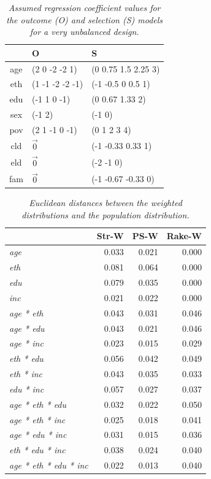 \documentclass[11pt]{article}
\begin{document}
\begin{table}
\begin{center}
\footnotesize
\begin{tabular}{c|p{7cm}|p{7cm}}
&O&S\\
\hline
age&(2 0 -2 -2 1)&(0 0.75 1.5 2.25 3)\\
eth&(1 -1 -2 -2 -1)&(-1 -0.5 0 0.5 1)\\
edu&(-1 1 0 -1)&(0 0.67 1.33 2)\\
sex&(-1 2)&(-1 0)\\
pov&(2 1 -1 0 -1)&(0 1 2 3 4)\\
cld&$\vec{0}$&(-1 -0.33 0.33 1)\\
eld&$\vec{0}$&(-2 -1 0)\\
fam&$\vec{0}$&(-1 -0.67 -0.33 0)
\end{tabular}
\end{center}
\caption{\em Assumed regression coefficient values for the outcome (O) and selection (S) models for a very unbalanced design.}
\label{s2-design-case2}
\end{table}



\begin{table}[ht]
\centering
\begin{tabular}{lrrr}
 & Str-W & PS-W & Rake-W \\ 
 \hline
 {\em age} & 0.033 & 0.021 & 0.000\\
 {\em eth}& 0.081 & 0.064 & 0.000 \\ 
{\em edu}  & 0.079 & 0.035 & 0.000 \\ 
{\em inc}& 0.021 & 0.022 & 0.000 \\ 

{\em age * eth}& 0.043 & 0.031 & 0.046 \\
{\em age * edu}& 0.043 & 0.021 & 0.046 \\
{\em age * inc}& 0.023 & 0.015 & 0.029 \\

{\em eth * edu} & 0.056 & 0.042 & 0.049 \\ 
{\em eth * inc}& 0.043 & 0.035 & 0.033 \\ 
{\em edu * inc} & 0.057 & 0.027 & 0.037 \\

{\em age * eth * edu}& 0.032 & 0.022 & 0.050 \\ 
{\em age * eth * inc}& 0.025 & 0.018 & 0.041 \\


{\em age * edu * inc } & 0.031 & 0.015 & 0.036 \\
{\em eth * edu * inc}&0.038 & 0.024 & 0.040 \\
{\em age * eth * edu * inc}& 0.022 & 0.013 & 0.040
\end{tabular}
\caption{\em Euclidean distances between the weighted distributions and the population distribution.}
\label{prob-dist}
\end{table}
\end{document}
